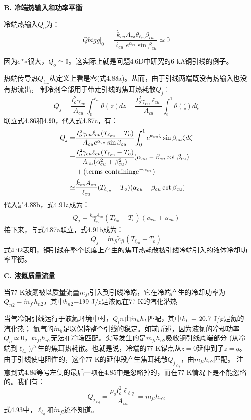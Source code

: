 \textbf{B. 冷端热输入和功率平衡}

冷端热输入$Q_o$为：
\begin{equation}%
Qbigg|_0=\frac{\tilde{k}_{cu}A_{cu}\theta_{\ell_{cu}}\beta_{cu}}{\ell_{cu}e^{\alpha_{cu}}\sin\beta_{cu}}\simeq 0
\end{equation}

因为$e^{\alpha_{cu}}$很大，$Q_o\simeq 0$。这实际上就是问题4.6D中研究的6 kA铜引线的例子。

热端传导热$Q_{\ell_{cu}}$从定义上看是零(式4.88a)。从而，由于引线两端既没有热输入也没有热流出，
制冷剂全部用于带走引线的焦耳热耗散$Q_j$：
\begin{equation}%
Q_j=\frac{I_{o}^{2}\gamma_{cu}}{A_{cu}}\int_{0}^{\ell_{cu}}\theta(z)dz 
=\frac{I_{o}^{2}\gamma_{cu}\ell_{cu}}{A_{cu}}\int_{0}^{1}\theta(\zeta)d\zeta
\end{equation}
联立式4.86和4.90，代入式4.87c，有：
\begin{align}%
Q_j=&\frac{I_{o}^{2}\gamma_{cu}\ell_{cu}(T_{\ell_{cu}}-T_o)}{A_{cu}e^{\alpha_{cu}}\sin\beta_{cu}}\int_{0}^{1}e^{\alpha_{cu}\zeta}\sin\beta_{cu}\zeta d\zeta \\\notag
=&\frac{I_{o}^{2}\gamma_{cu}\ell_{cu}(T_{\ell_{cu}}-T_o)}{A_{cu}(\alpha_{cu}^{2}+\beta_{cu}^{2})}(\alpha_{cu}-\beta_{cu}\cot\beta_{cu}) \\\notag
&+(\text{terms containing}e^{-\alpha_{cu}}) \\\notag
\simeq&\frac{\tilde{k}_{cu}A_{cu}}{\ell_{cu}}(T_{\ell_{cu}}-T_o)(\alpha_{cu}-\beta_{cu}\cot\beta_{cu})
\end{align}
代入是4.88b，式4.91a成为：
\begin{align*}%
Q_j=\frac{\tilde{k}_{cu}A_{cu}}{\ell_{cu}}(T_{\ell_{cu}}-T_o)(\alpha_{cu}+\alpha_{cu}) \tag{4.91b}
\end{align*}
接下来，与式4.87a联立，式4.91b成为：
\begin{equation}%
Q_j=\dot{m}_{fl}\tilde{c}_{fl}(T_{\ell_{cu}}-T_o)
\end{equation}
式4.92表明，铜引线在整个长度上产生的焦耳热耗散被引线冷端引入的液体冷却功率平衡。

\textbf{C. 液氮质量流量}

当77 K液氮被以质量流量$\dot{m}_{fl}$引入到引线冷端，它在冷端产生的冷却功率为
$Q_{n2}=\dot{m}_{fl}h_{n2}$，其中$h_{n2}$=199 J/g是液氮在77 K的汽化潜热

当气冷铜引线运行于液氦环境中时，$Q_in$由$\dot{m}_h h_L$匹配，其中$h_L$ = 20.7 J/g是氦的汽化热；
氦气的$\dot{m}_h$足以保持整个引线的稳定。如前所述，因为液氮的冷却功率$Q_o\simeq 0$，$\dot{m}_{fl}h_{n2}$无法在冷端匹配。实际发生的是$\dot{m}_{fl}h_{n2}$吸收铜引线底端部分
(从冷端到$\ell_{\ell_q}$)产生的焦耳热耗散。也就是说，冷端的77 K锚点从$z=0$延伸到了$z=q$。
由于引线使电阻性的，这个77 K的延伸段产生焦耳耗散$Q_{j_{\ell q}}$，由$\dot{m}_{fl}h_{n2}$匹配。
注意到式4.84等号左侧的最后一项在4.85中是忽略掉的，而在77 K情况下是不能忽略的。我们有：
\begin{equation}%
Q_{j_{\ell q}}=\frac{\rho_oI_{o}^{2}\ell_{\ell q}}{A_{cu}}=\dot{m}_{fl}h_{n2}
\end{equation}
式4.93中，$\ell_{\ell_q}$和$\dot{m}_{fl}$还不知道。

